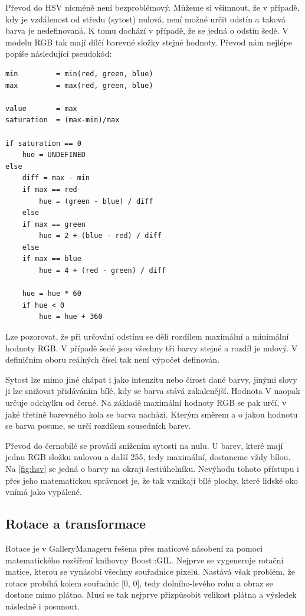 \documentclass[11pt,twoside,a4paper]{book}
\begin{document}
\indent
Převod do HSV nicméně není bezproblémový. Můžeme si všimnout, že v případě, kdy je vzdálenost od středu (sytost) nulová, není možné určit odstín a taková barva je nedefinovaná. K tomu dochází v případě, že se jedná o odstín šedé. V modelu RGB tak mají dílčí barevné složky stejné hodnoty. Převod nám nejlépe popíše následující pseudokód:

\begin{verbatim}
min         = min(red, green, blue)
max         = max(red, green, blue)

value       = max
saturation  = (max-min)/max

if saturation == 0
    hue = UNDEFINED
else
    diff = max - min
    if max == red
        hue = (green - blue) / diff
    else
    if max == green
        hue = 2 + (blue - red) / diff
    else
    if max == blue
        hue = 4 + (red - green) / diff

    hue = hue * 60
    if hue < 0
        hue = hue + 360
\end{verbatim}

\indent
Lze pozorovat, že při určování odstínu se dělí rozdílem maximální a minimální hodnoty RGB. V případě šedé jsou všechny tři barvy stejné a rozdíl je nulový. V definičním oboru reálných čísel tak není výpočet definován.

\indent
Sytost lze mimo jiné chápat i jako intenzitu nebo čirost dané barvy, jinými slovy ji lze snižovat přidáváním bílé, kdy se barva stává zakalenější. Hodnota V naopak určuje odchylku od černé. Na základě maximální hodnoty RGB se pak určí, v jaké třetině barevného kola se barva nachází. Kterým směrem a o jakou hodnotu se barva posune, se určí rozdílem sousedních barev.

\indent
Převod do černobílé se provádí snížením sytosti na nulu. U barev, které mají jednu RGB složku nulovou a další 255, tedy maximální, dostaneme vždy bílou. Na \ref{fig:hsv} se jedná o barvy na okraji šestiúhelníku. Nevýhodu tohoto přístupu i přes jeho matematickou správnost je, že tak vznikají bílé plochy, které lidské oko vnímá jako vypálené.

\subsection{Rotace a transformace}
\indent
Rotace je v GalleryManageru řešena přes maticové násobení za pomoci matematického rozšíření knihovny Boost::GIL. Nejprve se vygeneruje rotační matice, kterou se vynásobí všechny souřadnice pixelů. Nastává však problém, že rotace probíhá kolem souřadnic [0, 0], tedy dolního-levého rohu a obraz se dostane mimo plátno. Musí se tak nejprve přizpůsobit velikost plátna a výsledek následně i posunout.
\end{document}
